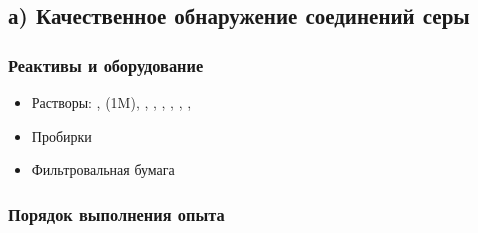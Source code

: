 \documentclass[a4paper, 12pt]{article}
\begin{document}
\subsection*{а) Качественное обнаружение соединений серы}
\subsubsection{Реактивы и оборудование}

\begin{itemize}
	\item Растворы: ,  (1M), , , , , , , 
	
	\item Пробирки
	
	\item Фильтровальная бумага
\end{itemize}

\subsubsection{Порядок выполнения опыта}
\end{document}
